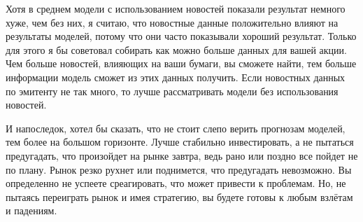 \documentclass[12pt, a4paper]{article}
\begin{document}
Хотя в среднем модели с использованием новостей показали результат немного хуже, чем без них, я считаю, что новостные данные положительно влияют на результаты моделей, потому что они часто показывали хороший результат. Только для этого я бы советовал собирать как можно больше данных для вашей акции. Чем больше новостей, влияющих на ваши бумаги, вы сможете найти, тем больше информации модель сможет из этих данных получить. Если новостных данных по эмитенту не так много, то лучше рассматривать модели без использования новостей.

И напоследок, хотел бы сказать, что не стоит слепо верить прогнозам моделей, тем более на большом горизонте. Лучше стабильно инвестировать, а не пытаться предугадать, что произойдет на рынке завтра, ведь рано или поздно все пойдет не по плану. Рынок резко рухнет или поднимется, что предугадать невозможно. Вы определенно не успеете среагировать, что может привести к проблемам. Но, не пытаясь переиграть рынок и имея стратегию, вы будете готовы к любым взлётам и падениям.

\newpage
\printbibliography
{}
\end{document}
